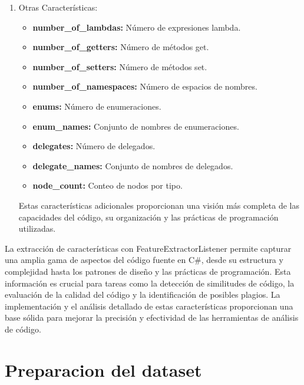 \begin{enumerate}
    \item Otras Características:
    \begin{itemize}
        \item {\bf number_of_lambdas:} Número de expresiones lambda.
        \item {\bf number_of_getters:} Número de métodos get.
        \item {\bf number_of_setters:} Número de métodos set.
        \item {\bf number_of_namespaces:} Número de espacios de nombres.
        \item {\bf enums:} Número de enumeraciones.
        \item {\bf enum_names:} Conjunto de nombres de enumeraciones.
        \item {\bf delegates:} Número de delegados.
        \item {\bf delegate_names:} Conjunto de nombres de delegados.
        \item {\bf node_count:} Conteo de nodos por tipo.
    \end{itemize}
    Estas características adicionales proporcionan una visión más completa de las capacidades del código, su organización y las prácticas de programación utilizadas.

 
\end{enumerate}
    
        
La extracción de características con FeatureExtractorListener permite capturar una amplia gama de aspectos del código fuente en C#, desde su estructura y complejidad hasta los patrones de diseño y las prácticas de programación. Esta información es crucial para tareas como la detección de similitudes de código, la evaluación de la calidad del código y la identificación de posibles plagios. La implementación y el análisis detallado de estas características proporcionan una base sólida para mejorar la precisión y efectividad de las herramientas de análisis de código.

\section{Preparacion del dataset}


